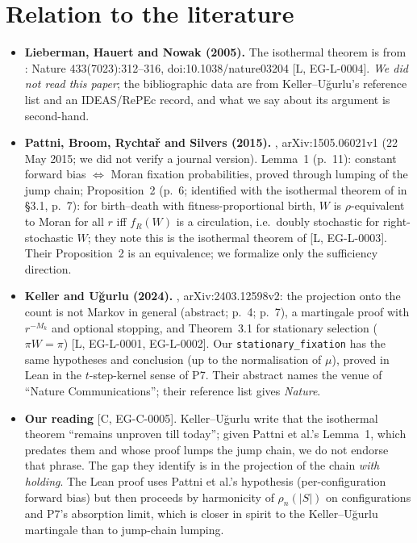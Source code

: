\documentclass[11pt]{article}
\newcommand{\tier}[1]{\textsf{[#1]}}
\newcommand{\lean}[1]{\texttt{#1}}
\newcommand{\rhoF}{\rho_n}
\begin{document}
\section{Relation to the literature}\label{sec:lit}
\begin{itemize}\setlength\itemsep{1pt}
\item \textbf{Lieberman, Hauert and Nowak (2005).} The isothermal theorem is from \cite{LHN}: Nature 433(7023):312--316, doi:10.1038/nature03204 \tier{L, EG-L-0004}. \emph{We did not read this paper}; the bibliographic data are from Keller--U\u{g}urlu's reference list and an IDEAS/RePEc record, and what we say about its argument is second-hand.
\item \textbf{Pattni, Broom, Rychta\v{r} and Silvers (2015).} \cite{PBRS}, arXiv:1505.06021v1 (22 May 2015; we did not verify a journal version). Lemma~1 (p.~11): constant forward bias $\iff$ Moran fixation probabilities, proved through lumping of the jump chain; Proposition~2 (p.~6; identified with the isothermal theorem of \cite{LHN} in \S3.1, p.~7): for birth--death with fitness-proportional birth, $W$ is $\rho$-equivalent to Moran for all $r$ iff $f_R(W)$ is a circulation, i.e.\ doubly stochastic for right-stochastic $W$; they note this is the isothermal theorem of \cite{LHN} \tier{L, EG-L-0003}. Their Proposition~2 is an equivalence; we formalize only the sufficiency direction.
\item \textbf{Keller and U\u{g}urlu (2024).} \cite{KU}, arXiv:2403.12598v2: the projection onto the count is not Markov in general (abstract; p.~4; p.~7), a martingale proof with $r^{-M_k}$ and optional stopping, and Theorem~3.1 for stationary selection ($\pi W=\pi$) \tier{L, EG-L-0001, EG-L-0002}. Our \lean{stationary\_fixation} has the same hypotheses and conclusion (up to the normalisation of $\mu$), proved in Lean in the $t$-step-kernel sense of P7. Their abstract names the venue of \cite{LHN} ``Nature Communications''; their reference list gives \emph{Nature}.
\item \textbf{Our reading} \tier{C, EG-C-0005}. Keller--U\u{g}urlu write that the isothermal theorem ``remains unproven till today''; given Pattni et al.'s Lemma~1, which predates them and whose proof lumps the jump chain, we do not endorse that phrase. The gap they identify is in the projection of the chain \emph{with holding}. The Lean proof uses Pattni et al.'s hypothesis (per-configuration forward bias) but then proceeds by harmonicity of $\rhoF(|S|)$ on configurations and P7's absorption limit, which is closer in spirit to the Keller--U\u{g}urlu martingale than to jump-chain lumping.
\end{itemize}
\end{document}
